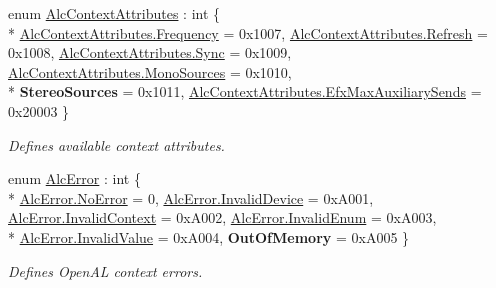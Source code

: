 \begin{DoxyCompactItemize}
enum \hyperlink{namespace_open_t_k_1_1_audio_1_1_open_a_l_a4c57e167c6b3b29f8ec5c826be530017}{Alc\-Context\-Attributes} \-: int \{ \\*
\hyperlink{namespace_open_t_k_1_1_audio_1_1_open_a_l_a4c57e167c6b3b29f8ec5c826be530017a7cf395303ce3665a9834721d4b748e4b}{Alc\-Context\-Attributes.\-Frequency} = 0x1007, 
\hyperlink{namespace_open_t_k_1_1_audio_1_1_open_a_l_a4c57e167c6b3b29f8ec5c826be530017a63a6a88c066880c5ac42394a22803ca6}{Alc\-Context\-Attributes.\-Refresh} = 0x1008, 
\hyperlink{namespace_open_t_k_1_1_audio_1_1_open_a_l_a4c57e167c6b3b29f8ec5c826be530017ad8e87c0927539672f54462c837be0b7f}{Alc\-Context\-Attributes.\-Sync} = 0x1009, 
\hyperlink{namespace_open_t_k_1_1_audio_1_1_open_a_l_a4c57e167c6b3b29f8ec5c826be530017aa7bf7342bc25db7ed901b09ab4a27684}{Alc\-Context\-Attributes.\-Mono\-Sources} = 0x1010, 
\\*
{\bfseries Stereo\-Sources} = 0x1011, 
\hyperlink{namespace_open_t_k_1_1_audio_1_1_open_a_l_a4c57e167c6b3b29f8ec5c826be530017a7ff17bb3868ebe884974e808eab3acf9}{Alc\-Context\-Attributes.\-Efx\-Max\-Auxiliary\-Sends} = 0x20003
 \}
\begin{DoxyCompactList}\small\item\em Defines available context attributes. \end{DoxyCompactList}\item 
enum \hyperlink{namespace_open_t_k_1_1_audio_1_1_open_a_l_a2684b7587fe0457a0203cacbdace7bc5}{Alc\-Error} \-: int \{ \\*
\hyperlink{namespace_open_t_k_1_1_audio_1_1_open_a_l_a2684b7587fe0457a0203cacbdace7bc5a70a47cae4eb221930f2663fd244369ea}{Alc\-Error.\-No\-Error} = 0, 
\hyperlink{namespace_open_t_k_1_1_audio_1_1_open_a_l_a2684b7587fe0457a0203cacbdace7bc5a3634e01cc1296daece9832c5396808c2}{Alc\-Error.\-Invalid\-Device} = 0x\-A001, 
\hyperlink{namespace_open_t_k_1_1_audio_1_1_open_a_l_a2684b7587fe0457a0203cacbdace7bc5a726d67a6ff0e68c590102fc134640e0c}{Alc\-Error.\-Invalid\-Context} = 0x\-A002, 
\hyperlink{namespace_open_t_k_1_1_audio_1_1_open_a_l_a2684b7587fe0457a0203cacbdace7bc5abaf0777e3144a52d6fd69816f4ac22c8}{Alc\-Error.\-Invalid\-Enum} = 0x\-A003, 
\\*
\hyperlink{namespace_open_t_k_1_1_audio_1_1_open_a_l_a2684b7587fe0457a0203cacbdace7bc5a223e81e8afa42c41346a6696560ecc7b}{Alc\-Error.\-Invalid\-Value} = 0x\-A004, 
{\bfseries Out\-Of\-Memory} = 0x\-A005
 \}
\begin{DoxyCompactList}\small\item\em Defines Open\-A\-L context errors. \end{DoxyCompactList}\item 

\end{DoxyCompactItemize}
